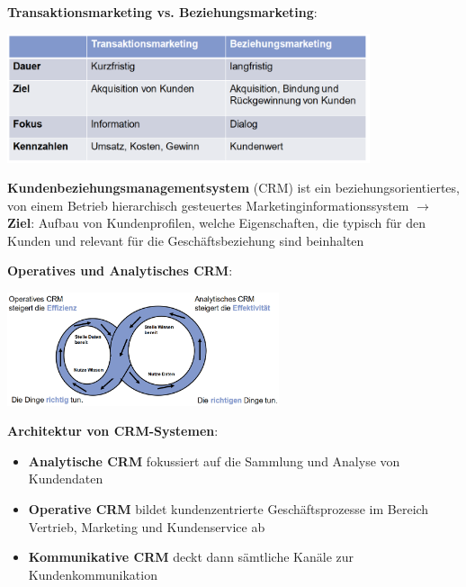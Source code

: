 \textbf{Transaktionsmarketing vs. Beziehungsmarketing}:
\begin{center}
	\includegraphics[width=0.8\textwidth]{images/tb.png}
\end{center}

\textbf{Kundenbeziehungsmanagementsystem} (CRM) ist ein beziehungsorientiertes, von einem Betrieb hierarchisch gesteuertes Marketinginformationssystem $\rightarrow$ \textbf{Ziel}: Aufbau von Kundenprofilen, welche Eigenschaften, die typisch für den Kunden und relevant für die Geschäftsbeziehung sind beinhalten

\pagebreak
\textbf{Operatives und Analytisches CRM}:
\begin{center}
	\includegraphics[width=0.6\textwidth]{images/crm.png}
\end{center}

\textbf{Architektur von CRM-Systemen}:
\begin{itemize}
	\item \textbf{Analytische CRM} fokussiert auf die Sammlung und Analyse von Kundendaten
	\item \textbf{Operative CRM} bildet kundenzentrierte Geschäftsprozesse im Bereich Vertrieb, Marketing und Kundenservice ab
	\item \textbf{Kommunikative CRM} deckt dann sämtliche Kanäle zur Kundenkommunikation
\end{itemize}
